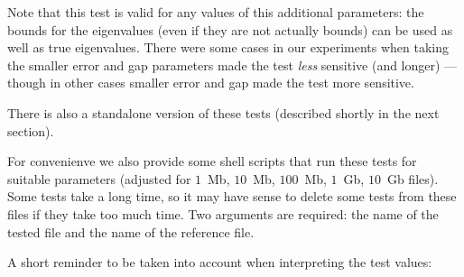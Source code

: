 \documentclass[12pt,a4paper,fullpage]{article}
\begin{document}
\begin{description}
Note that this test is valid for any values of this additional parameters: the bounds for the eigenvalues (even if they are not actually bounds) can be used as well as true eigenvalues.  There were some cases in our experiments when taking the smaller error and gap parameters made the test \emph{less} sensitive (and longer) --- though in other cases smaller error and gap made the test more sensitive.

There is also a standalone version of these tests (described shortly in the next section).

\end{description}

For convenienve we also provide  some shell scripts that run these tests for suitable parameters (adjusted for $1$~Mb, $10$~Mb, $100$~Mb, $1$~Gb, $10$~Gb files). Some tests take a long time, so it may have sense to delete some tests from these files if they take too much time. Two arguments are required: the name of the tested file and the name of the reference file.

A short reminder to be taken into account when interpreting the test values:
\end{document}
